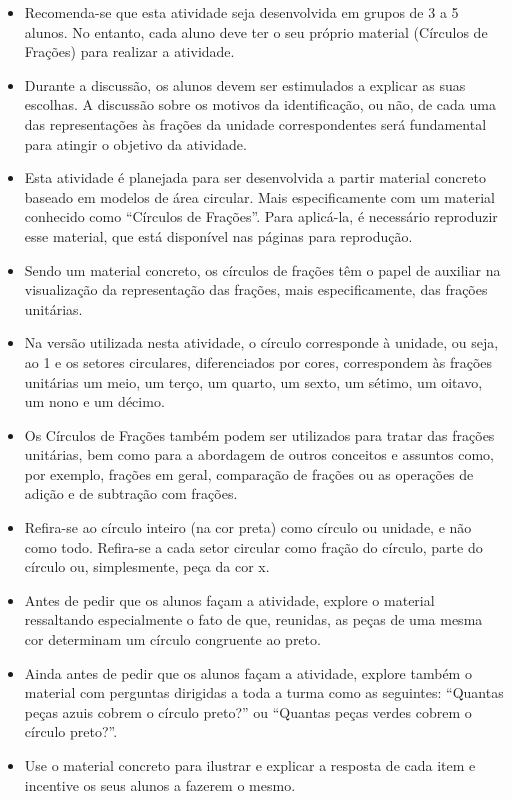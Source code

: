 \begin{multicols}{2}
\begin{itemize}
 \item Recomenda-se que esta atividade seja desenvolvida em grupos de 3 a 5 alunos. No entanto, cada aluno deve ter o seu próprio material (Círculos de Frações) para realizar a atividade.
 \item   Durante a discussão, os alunos devem ser estimulados a explicar as suas escolhas. A discussão sobre os motivos da identificação, ou não, de cada uma das representações às frações da unidade correspondentes será fundamental para atingir o objetivo da atividade.
 \item    Esta atividade é planejada para ser desenvolvida a partir material concreto baseado em modelos de área circular. Mais especificamente com um material conhecido como ``Círculos de Frações''. Para aplicá-la, é necessário reproduzir esse material, que está disponível nas páginas para reprodução.
    \item Sendo um material concreto, os círculos de frações têm o papel de auxiliar na visualização da representação das frações, mais especificamente, das frações unitárias.
    \item Na versão utilizada nesta atividade, o círculo corresponde à unidade, ou seja, ao 1 e os setores circulares, diferenciados por cores, correspondem às frações unitárias um meio, um terço, um quarto, um sexto, um sétimo, um oitavo, um nono e um décimo.
    \item Os Círculos de Frações também podem ser utilizados para tratar das frações unitárias, bem como para a abordagem de outros conceitos e assuntos como, por exemplo, frações em geral, comparação de frações ou as operações de adição e de subtração com frações.
    \item Refira-se ao círculo inteiro (na cor preta) como círculo ou unidade, e não como todo. Refira-se a cada setor circular como fração do círculo, parte do círculo ou, simplesmente, peça da cor x.
    \item Antes de pedir que os alunos façam a atividade, explore o material ressaltando especialmente o fato de que, reunidas, as peças de uma mesma cor determinam um círculo congruente ao preto.
    \item Ainda antes de pedir que os alunos façam a atividade, explore também o material com perguntas dirigidas a toda a turma como as seguintes: ``Quantas peças azuis cobrem o círculo preto?'' ou ``Quantas peças verdes cobrem o círculo preto?''.
    \item Use o material concreto para ilustrar e explicar a resposta de cada item e incentive os seus alunos a fazerem o mesmo.

\end{itemize}
\end{multicols}
